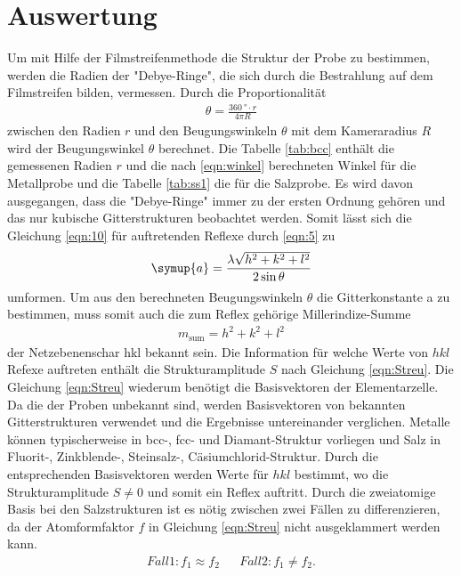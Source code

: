 \section{Auswertung}
\label{sec:Auswertung}

Um mit Hilfe der Filmstreifenmethode die Struktur der Probe zu bestimmen, werden
die Radien der "Debye-Ringe", die sich durch die Bestrahlung auf dem Filmstreifen bilden,
vermessen. Durch die Proportionalität
\begin{align}
\theta=\frac{\SI{360}{\degree}\cdot r}{4 \pi R } \label{eqn:winkel}
\end{align}
zwischen den Radien $r$ und den Beugungswinkeln $\theta$
mit dem Kameraradius $R$ wird der Beugungswinkel $\theta$ berechnet.
Die Tabelle \ref{tab:bcc} enthält die gemessenen Radien $r$
und die nach \eqref{eqn:winkel} berechneten Winkel
für die Metallprobe und die Tabelle \ref{tab:ss1} die für die Salzprobe.
Es wird davon ausgegangen, dass die "Debye-Ringe" immer zu der ersten Ordnung gehören
und das nur kubische Gitterstrukturen beobachtet werden.
Somit lässt sich die Gleichung \ref{eqn:10} für auftretenden
Reflexe durch \eqref{eqn:5} zu
\begin{align}
\symup{a} = \frac{\lambda \sqrt{h^2 +k^2+l^2}}{2\sin{\theta}} \label{eqn:Gitterkonst}
\end{align}
umformen.
Um aus den berechneten Beugungswinkeln $\theta$ die Gitterkonstante a
zu bestimmen, muss somit auch die zum Reflex gehörige Millerindize-Summe
\begin{align*}
  m_{\mathrm{sum}}=h^{2} + k^{2} + l^{2}
\end{align*}
der Netzebenenschar hkl bekannt sein.
Die Information für welche Werte von $hkl$ Refexe auftreten
enthält die Strukturamplitude $S$ nach Gleichung \eqref{eqn:Streu}.
Die Gleichung \eqref{eqn:Streu} wiederum benötigt die Basisvektoren
der Elementarzelle. Da die der Proben unbekannt sind, werden
Basisvektoren von bekannten Gitterstrukturen verwendet und die Ergebnisse
untereinander verglichen. Metalle können typischerweise in
 bcc-, fcc- und Diamant-Struktur
vorliegen und Salz in Fluorit-, Zinkblende-,
Steinsalz-, Cäsiumchlorid-Struktur.
Durch die entsprechenden Basisvektoren
werden Werte für $hkl$ bestimmt, wo die Strukturamplitude
$S\neq0$ und somit ein Reflex auftritt.
Durch die zweiatomige Basis bei den
Salzstrukturen ist es nötig zwischen zwei Fällen zu differenzieren,
da der Atomformfaktor $f$ in Gleichung
\eqref{eqn:Streu} nicht ausgeklammert werden kann.
\begin{align*}
  Fall 1: f_1\approx f_2  & & Fall 2: f_1\neq f_2.
\end{align*}
